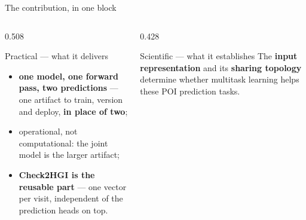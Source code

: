 \documentclass{beamer}
\begin{document}
%
\begin{frame}{The contribution, in one block}
    \vfill
    \begin{columns}[T,onlytextwidth]
        \begin{column}{0.508\textwidth}
            \begin{block}{Practical --- what it delivers}
                \small
                \begin{itemize}\setlength{\itemsep}{5pt}\setlength{\parskip}{0pt}
                    \item \textbf{one model, one forward pass, two predictions} --- one artifact to
                          train, version and deploy, \textbf{in place of two};
                    \item \alert{operational, not computational}: the joint model is the larger
                          artifact;
                    \item \textbf{Check2HGI is the reusable part} --- one vector per visit,
                          independent of the prediction heads on top.
                \end{itemize}
            \end{block}
        \end{column}
        \hfill
        \begin{column}{0.428\textwidth}
            \begin{exampleblock}{Scientific --- what it establishes}
                \centering
                \vspace{2mm}
                The \textbf{input representation} and its \textbf{sharing topology} determine
                \alert{whether} multitask learning helps these POI prediction tasks.
                \vspace{2mm}
            \end{exampleblock}
        \end{column}
    \end{columns}
    \vfill
\end{frame}
\end{document}
